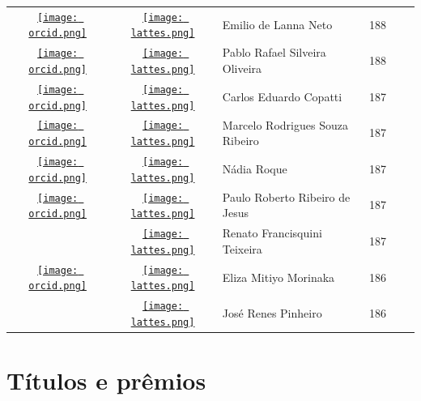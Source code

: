\documentclass[12pt,brazil]{article}\usepackage[]{graphicx}\usepackage[]{xcolor}
\begin{document}
\begin{longtable}{cclrll}
\href{https://orcid.org/0000-0002-6170-1842}{\texttt{[image: orcid.png]}} & \href{http://lattes.cnpq.br/6341280285112278}{\texttt{[image: lattes.png]}} & Emilio de Lanna Neto & 188 &  &  \\

\href{https://orcid.org/0000-0001-9541-3737}{\texttt{[image: orcid.png]}} & \href{http://lattes.cnpq.br/0858029972032771}{\texttt{[image: lattes.png]}} & Pablo Rafael Silveira Oliveira & 188 &  &  \\

\href{https://orcid.org/0000-0002-0114-0334}{\texttt{[image: orcid.png]}} & \href{http://lattes.cnpq.br/2254441871778798}{\texttt{[image: lattes.png]}} & Carlos Eduardo Copatti & 187 &  &  \\

\href{https://orcid.org/0000-0003-3675-6101}{\texttt{[image: orcid.png]}} & \href{http://lattes.cnpq.br/1614542610299046}{\texttt{[image: lattes.png]}} & Marcelo Rodrigues Souza Ribeiro & 187 &  &  \\

\href{https://orcid.org/0000-0002-2103-917X}{\texttt{[image: orcid.png]}} & \href{http://lattes.cnpq.br/5440627437026794}{\texttt{[image: lattes.png]}} & Nádia Roque & 187 &  &  \\

\href{https://orcid.org/0000-0001-9622-5076}{\texttt{[image: orcid.png]}} & \href{http://lattes.cnpq.br/2372350954162223}{\texttt{[image: lattes.png]}} & Paulo Roberto Ribeiro de Jesus & 187 &  &  \\

 & \href{http://lattes.cnpq.br/5431372913641696}{\texttt{[image: lattes.png]}} & Renato Francisquini Teixeira & 187 &  &  \\

\href{https://orcid.org/0000-0003-2637-8127}{\texttt{[image: orcid.png]}} & \href{http://lattes.cnpq.br/6863118601469508}{\texttt{[image: lattes.png]}} & Eliza Mitiyo Morinaka & 186 &  &  \\

 & \href{http://lattes.cnpq.br/2333794966860226}{\texttt{[image: lattes.png]}} & José Renes Pinheiro & 186 &  &  \\


\bottomrule
\end{longtable}

\clearpage

\section{Títulos e prêmios}
\end{document}
